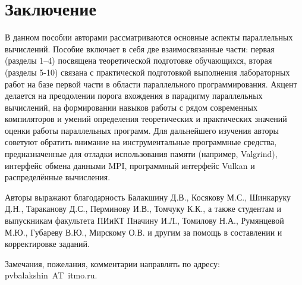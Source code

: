 \section*{Заключение}

В данном пособии авторами рассматриваются основные аспекты параллельных вычислений.
Пособие включает в себя две взаимосвязанные части: первая (разделы 1–4) посвящена теоретической подготовке обучающихся, вторая (разделы 5-10) связана с практической подготовкой выполнения лабораторных работ на базе первой части в области параллельного программирования.
Акцент делается на преодолении порога вхождения в парадигму параллельных вычислений, на формировании навыков работы с рядом современных компиляторов и умений определения теоретических и практических значений оценки работы параллельных программ.
Для дальнейшего изучения авторы советуют обратить внимание на инструментальные программные средства, предназначенные для отладки использования памяти (например, Valgrind), интерфейс обмена данными MPI, программный интерфейс Vulkan и распределённые вычисления.

Авторы выражают благодарность Балакшину Д.В., Косякову М.С., Шинкаруку Д.Н., Тараканову Д.С., Перминову И.В., Томчуку К.К., а также студентам и выпускникам факультета ПИиКТ Пначину И.Л., Томилову Н.А., Румянцевой М.Ю., Губареву В.Ю., Мирскому О.В. и другим за помощь в составлении и корректировке заданий.

Замечания, пожелания, комментарии направлять по адресу: pvbalakshin~AT~itmo.ru. 
